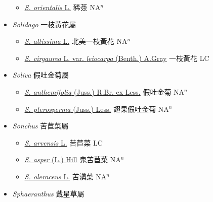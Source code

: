 \begin{itemize}
  \begin{itemize}
        \item[] \href{http://www.theplantlist.org/tpl1.1/search?q=Sigesbeckia+orientalis}{\textit{S. orientalis} L.}   豨薟 NA$^n$
  \end{itemize}
 \item[] \textit{Solidago} 一枝黃花屬
                    
  \begin{itemize}
        \item[] \href{http://www.theplantlist.org/tpl1.1/search?q=Solidago+altissima}{\textit{S. altissima} L.}   北美一枝黃花 NA$^n$
        \item[] \href{http://www.theplantlist.org/tpl1.1/search?q=Solidago+virgaurea+var.+leiocarpa}{\textit{S. virgaurea} L. var. \textit{leiocarpa} (Benth.) A.Gray}   一枝黃花 LC
  \end{itemize}
 \item[] \textit{Soliva} 假吐金菊屬
                    
  \begin{itemize}
        \item[] \href{http://www.theplantlist.org/tpl1.1/search?q=Soliva+anthemifolia}{\textit{S. anthemifolia} (Juss.) R.Br. ex Less.}   假吐金菊 NA$^n$
        \item[] \href{http://www.theplantlist.org/tpl1.1/search?q=Soliva+pterosperma}{\textit{S. pterosperma} (Juss.) Less.}   翅果假吐金菊 NA$^n$
  \end{itemize}
 \item[] \textit{Sonchus} 苦苣菜屬
                    
  \begin{itemize}
        \item[] \href{http://www.theplantlist.org/tpl1.1/search?q=Sonchus+arvensis}{\textit{S. arvensis} L.}   苦苣菜 LC
        \item[] \href{http://www.theplantlist.org/tpl1.1/search?q=Sonchus+asper}{\textit{S. asper} (L.) Hill}   鬼苦苣菜 NA$^n$
        \item[] \href{http://www.theplantlist.org/tpl1.1/search?q=Sonchus+oleraceus}{\textit{S. oleraceus} L.}   苦滇菜 NA$^n$
  \end{itemize}
 \item[] \textit{Sphaeranthus} 戴星草屬
                    

\end{itemize}
